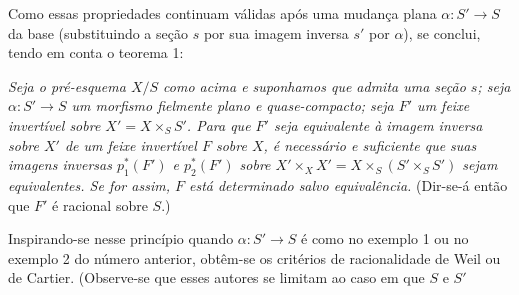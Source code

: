 \documentclass[11pt,twoside,openany]{book}
\numberwithin{equation}{section}
\theoremstyle{plain}
\theoremstyle{definition}
\theoremstyle{remark}
\begin{document}
Como essas propriedades continuam válidas após uma mudança plana
$\alpha:S'\longrightarrow S$ da base (substituindo a seção $s$ por sua
imagem inversa $s'$ por $\alpha$), se conclui, tendo em conta o teorema 1:

\emph{Seja o pré-esquema $X/S$ como acima e suponhamos que admita uma seção
$s$; seja $\alpha:S'\longrightarrow S$ um morfismo fielmente plano e
quase-compacto; seja $F'$ um feixe invertível sobre $X'=X\times_SS'$. Para que $F'$
seja equivalente à imagem inversa sobre $X'$ de um feixe invertível $F$ sobre
$X$, é necessário e suficiente que suas imagens inversas $p_1^*(F')$ e
$p_2^*(F')$ sobre $X'\times_XX'=X\times_S(S'\times_SS')$ sejam equivalentes. Se
for assim, $F$ está determinado salvo equivalência.} (Dir-se-á então que $F'$
é racional sobre $S$.)

Inspirando-se nesse princípio quando $\alpha:S'\longrightarrow S$ é como no
exemplo 1 ou no exemplo 2 do número anterior, obtêm-se os critérios de
racionalidade de Weil ou de Cartier. (Observe-se que esses autores se limitam ao
caso em que $S$ e $S'$
\end{document}
